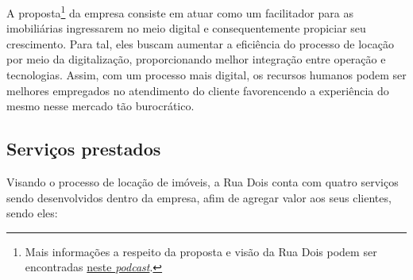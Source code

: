 A proposta\footnote{Mais informações a respeito da proposta e visão da Rua Dois podem
ser encontradas
\href{https://open.spotify.com/episode/2jYKPCPLCIdDWwxpR0theT?si=dT6WUG7JSEGJH3mVVIJitQ}
{neste \textit{podcast}}.}
da empresa consiste em atuar como um facilitador para as imobiliárias
ingressarem no meio digital e consequentemente propiciar seu crescimento. Para tal,
eles buscam aumentar a eficiência do processo de locação por meio da digitalização,
proporcionando melhor integração entre operação e tecnologias. Assim, com um processo
mais digital, os recursos humanos podem ser melhores empregados no atendimento do
cliente favorencendo a experiência do mesmo nesse mercado tão burocrático.


%
%
%


\subsection{Serviços prestados}

Visando o processo de locação de imóveis, a Rua Dois conta com quatro serviços
sendo desenvolvidos dentro da empresa, afim de agregar valor aos seus clientes,
sendo eles:

